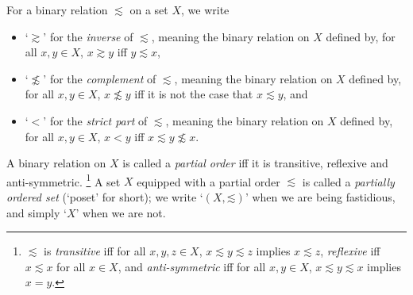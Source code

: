 \begin{notation}
	\label{notation:relations}
	For a binary relation $\lesssim$ on a set $X$, we write
	\begin{itemize}

		\item `$\gtrsim$' for the \emph{inverse} of $\lesssim$, meaning the binary relation on $X$ defined by, for all $x,y \in X$, $x \gtrsim y$ iff $y \lesssim x$,

		\item `$\not\lesssim$' for the \emph{complement} of $\lesssim$, meaning the binary relation on $X$ defined by, for all $x,y \in X$, $x \not\lesssim y$ iff it is not the case that $x \lesssim y$, and

		\item `$<$' for the \emph{strict part} of $\lesssim$, meaning the binary relation on $X$ defined by, for all $x,y \in X$, $x < y$ iff $x \lesssim y \not\lesssim x$.

	\end{itemize}
\end{notation}

\begin{definition}
	\label{definition:poset}
	A binary relation on $X$ is called a \emph{partial order} iff it is transitive, reflexive and anti-symmetric.%
		\footnote{$\lesssim$ is \emph{transitive} iff for all $x,y,z \in X$, $x \lesssim y \lesssim z$ implies $x \lesssim z$, \emph{reflexive} iff $x \lesssim x$ for all $x \in X$, and \emph{anti-symmetric} iff for all $x,y \in X$, $x \lesssim y \lesssim x$ implies $x=y$.}
	A set $X$ equipped with a partial order $\lesssim$ is called a \emph{partially ordered set} (`poset' for short); we write `$(X,\mathord{\lesssim})$' when we are being fastidious, and simply `$X$' when we are not.
\end{definition}


